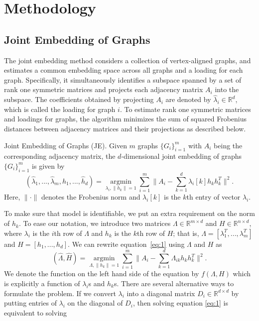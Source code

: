 \documentclass[10pt,journal,compsoc]{IEEEtran}
\newenvironment{definition}[1][Definition]{\begin{trivlist}
		\item[\hskip \labelsep {\bfseries #1}]}{\end{trivlist}}
\begin{document}
\section{Methodology}
\subsection{Joint Embedding of Graphs}
The joint embedding method considers a collection of vertex-aligned graphs, and estimates a common embedding space across all graphs and a loading for each graph. Specifically, it simultaneously identifies a subspace spanned by a set of rank one symmetric matrices and projects each adjacency matrix $A_i$ into the subspace. The coefficients obtained by projecting $A_i$ are denoted by $\hat{\lambda}_i \in \mathbb{R}^d$, which is called the loading for graph $i$. To estimate rank one symmetric matrices and loadings for graphs, the algorithm minimizes the sum of squared Frobenius distances between adjacency matrices and their projections as described below.
\begin{definition} Joint Embedding of Graphs (JE). Given $m$ graphs $\{G_i \} _{i=1}^{m}$ with $A_i$ being the corresponding adjacency matrix, the $d$-dimensional joint embedding of graphs $\{G_i \} _{i=1}^{m}$ is given by
\begin{equation}\label{eq:1}
 (\hat{\lambda}_1,...,\hat{\lambda}_m,\hat{h}_1,...,\hat{h}_d) = \underset{\lambda_i,\|h_k\|=1}{\operatorname{argmin}} \sum\limits_{i=1}^{m} \| A_i- \sum\limits_{k=1}^{d} \lambda_{i}[k] h_k h_k^T \|  ^2.  
\end{equation}
Here, $\| \cdot \|$ denotes the Frobenius norm and $\lambda_{i}[k]$ is the $k$th entry of vector $\lambda_i$.
\end{definition}
To make sure that model is identifiable, we put an extra requirement on the norm of $h_k$. To ease our notation, we introduce two matrices $\Lambda \in \mathbb{R}^{m \times d}$ and $H\in \mathbb{R}^{n \times d}$, where $\lambda_i$ is the $i$th row of $\Lambda$ and $h_k$ is the $k$th row of $H$; that is, $\Lambda=[\lambda_1^T,...,\lambda_m^T]$ and $H=[h_1,...,h_d]$. We can rewrite equation~\eqref{eq:1} using $\Lambda$ and $H$ as
\begin{equation*}
(\hat{\Lambda},\hat{H}) = \underset{\Lambda,\|h_k\|=1}{\operatorname{argmin}} \sum\limits_{i=1}^{m} \| A_i- \sum\limits_{k=1}^{d} \Lambda_{ik} h_k h_k^T \|  ^2.  
\end{equation*}
 We denote the function on the left hand side of the equation by $f(\Lambda,H)$ which is explicitly a function of $\lambda_i$s and $h_k$s. There are several alternative ways to formulate the problem. If we convert $\lambda_i$ into a diagonal matrix $D_i \in \mathbb{R}^{d \times d}$ by putting entries of $\lambda_i$ on the diagonal of $D_i$, then solving equation \eqref{eq:1} is equivalent to solving
\end{document}
